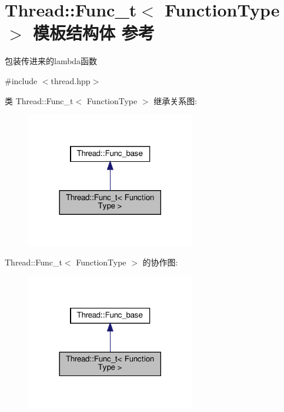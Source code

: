 \hypertarget{structThread_1_1Func__t}{}\section{Thread\+:\+:Func\+\_\+t$<$ Function\+Type $>$ 模板结构体 参考}
\label{structThread_1_1Func__t}


包装传进来的lambda函数  




{\ttfamily \#include $<$thread.\+hpp$>$}



类 Thread\+:\+:Func\+\_\+t$<$ Function\+Type $>$ 继承关系图\+:\nopagebreak
\begin{figure}[H]
\begin{center}
\leavevmode
\includegraphics[width=209pt]{structThread_1_1Func__t__inherit__graph}
\end{center}
\end{figure}


Thread\+:\+:Func\+\_\+t$<$ Function\+Type $>$ 的协作图\+:\nopagebreak
\begin{figure}[H]
\begin{center}
\leavevmode
\includegraphics[width=209pt]{structThread_1_1Func__t__coll__graph}
\end{center}
\end{figure}
